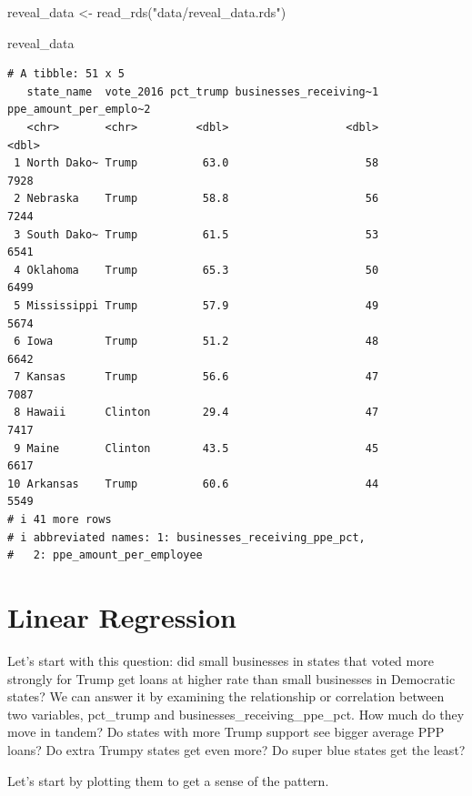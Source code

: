\documentclass[
  letterpaper,
  DIV=11,
  numbers=noendperiod]{scrreprt}
\newenvironment{Shaded}{\begin{snugshade}}{\end{snugshade}}
\newcommand{\FunctionTok}[1]{\textcolor[rgb]{0.28,0.35,0.67}{#1}}
\newcommand{\NormalTok}[1]{\textcolor[rgb]{0.00,0.23,0.31}{#1}}
\newcommand{\OtherTok}[1]{\textcolor[rgb]{0.00,0.23,0.31}{#1}}
\newcommand{\StringTok}[1]{\textcolor[rgb]{0.13,0.47,0.30}{#1}}
\begin{document}
\begin{Shaded}
\begin{Highlighting}[]
\NormalTok{reveal\_data }\OtherTok{\textless{}{-}} \FunctionTok{read\_rds}\NormalTok{(}\StringTok{"data/reveal\_data.rds"}\NormalTok{)}

\NormalTok{reveal\_data}
\end{Highlighting}
\end{Shaded}

\begin{verbatim}
# A tibble: 51 x 5
   state_name  vote_2016 pct_trump businesses_receiving~1 ppe_amount_per_emplo~2
   <chr>       <chr>         <dbl>                  <dbl>                  <dbl>
 1 North Dako~ Trump          63.0                     58                   7928
 2 Nebraska    Trump          58.8                     56                   7244
 3 South Dako~ Trump          61.5                     53                   6541
 4 Oklahoma    Trump          65.3                     50                   6499
 5 Mississippi Trump          57.9                     49                   5674
 6 Iowa        Trump          51.2                     48                   6642
 7 Kansas      Trump          56.6                     47                   7087
 8 Hawaii      Clinton        29.4                     47                   7417
 9 Maine       Clinton        43.5                     45                   6617
10 Arkansas    Trump          60.6                     44                   5549
# i 41 more rows
# i abbreviated names: 1: businesses_receiving_ppe_pct,
#   2: ppe_amount_per_employee
\end{verbatim}


\hypertarget{linear-regression}{%
\chapter{Linear Regression}\label{linear-regression}}

Let's start with this question: did small businesses in states that
voted more strongly for Trump get loans at higher rate than small
businesses in Democratic states? We can answer it by examining the
relationship or correlation between two variables, pct\_trump and
businesses\_receiving\_ppe\_pct. How much do they move in tandem? Do
states with more Trump support see bigger average PPP loans? Do extra
Trumpy states get even more? Do super blue states get the least?

Let's start by plotting them to get a sense of the pattern.
\end{document}
